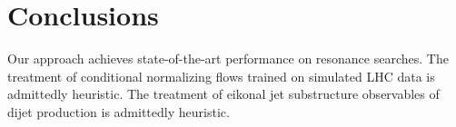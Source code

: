 \section{Conclusions}\label{sec:conclusions}

Our approach achieves state-of-the-art performance on resonance
searches. The treatment of conditional normalizing flows trained on
simulated LHC data is admittedly heuristic. The treatment of eikonal jet
substructure observables of dijet production is admittedly heuristic.

